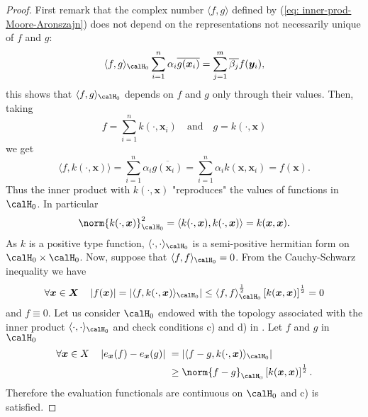 \begin{proof}
    First remark that the complex number $\langle f,g \rangle$ defined by (\ref{eq: inner-prod-Moore-Aronszajn}) does not depend on the representations not necessarily unique of $f$ and $g$:
    \begin{equation*}
        \langle f,g \rangle_{\calH_0} \sum_{i=1}^n \alpha_i \overline{g(\bm{x}_i)} = \sum_{j=1}^{m} \overline{\beta_j} f (\bm{y}_i),
    \end{equation*}
    this shows that $\langle f,g \rangle_{\calH_0}$ depends on $f$ and $g$ only through their values. Then, taking
    \begin{equation*}
        f = \sum_{i=1}^{n} k (\cdot , \bm{x}_i) \quad \text{and} \quad g = k (\cdot , \bm{x})
    \end{equation*}
    we get
    \begin{equation*}
        \langle f , k (\cdot , \bm{x}) \rangle = \sum_{i=1}^{n} \alpha_i \overline{g(\bm{x}_i)} = \sum_{i=1}^{n} \alpha_i k (\bm{x} , \bm{x}_i) = f(\bm{x}).
    \end{equation*}
    Thus the inner product with $k (\cdot , \bm{x})$ "reproduces" the values of functions in $\calH_0$. In particular
    \begin{equation*}
        \norm{k (\cdot , \bm{x})}_{\calH_0}^2 = \langle k (\cdot , \bm{x}) , k(\cdot , \bm{x}) \rangle = k (\bm{x} , \bm{x}).
    \end{equation*}
    As $k$ is a positive type function, $\langle \cdot  , \cdot \rangle_{\calH_0}$ is a semi-positive hermitian form on $\calH_0 \times \calH_0$. Now, suppose that $\langle f,f \rangle_{\calH_0} = 0$. From the Cauchy-Schwarz inequality we have
    \begin{align*}
        \forall \bm{x} \in \bm{X} \quad \left| f(\bm{x}) \right| = \left| \langle f , k (\cdot , \bm{x}) \rangle_{\calH_0} \right| \leq \langle f,f \rangle_{\calH_0}^{\frac{1}{2}} \left[ k (\bm{x} , \bm{x}) \right]^{\frac{1}{2}} = 0
    \end{align*}
    and $f \equiv 0$. Let us consider $\calH_0$ endowed with the topology associated with the inner product $\langle \cdot , \cdot \rangle_{\calH_0}$ and check conditions c) and d) in . Let $f$ and $g$ in $\calH_0$
    \begin{align*}
        \forall \bm{x} \in X \quad \left| e_{\bm{x}} (f) - e_{\bm{x}} (g) \right| \
         & = \left| \langle f-g, k(\cdot , \bm{x}) \rangle_{\calH_0} \right|         \\
         & \geq \norm{f-g}_{\calH_0} \left[ k (\bm{x},\bm{x}) \right]^{\frac{1}{2}}.
    \end{align*}
    Therefore the evaluation functionals are continuous on $\calH_0$ and c) is satisfied.


\end{proof}
